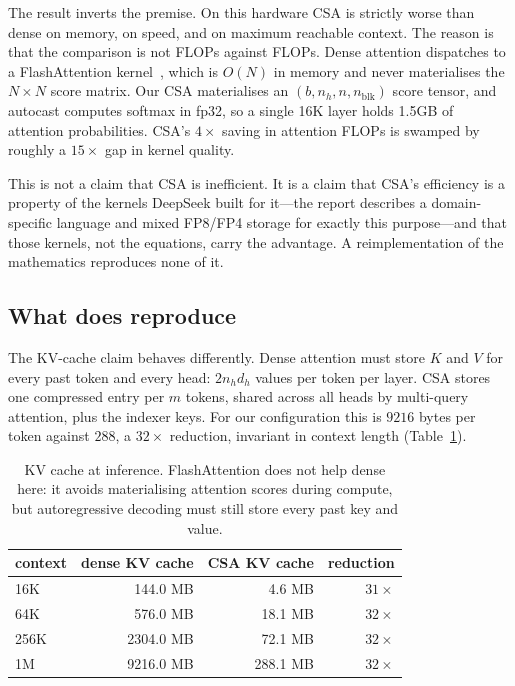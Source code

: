 \documentclass[11pt]{article}
\begin{document}
The result inverts the premise. On this hardware CSA is strictly worse than
dense on memory, on speed, and on maximum reachable context. The reason is that
the comparison is not FLOPs against FLOPs. Dense attention dispatches to a
FlashAttention kernel~\cite{dao2022flashattention}, which is $O(N)$ in memory
and never materialises the $N \times N$ score matrix. Our CSA materialises an
$(b, n_h, n, n_{\text{blk}})$ score tensor, and autocast computes softmax in
fp32, so a single 16K layer holds 1.5GB of attention probabilities. CSA's
$4\times$ saving in attention FLOPs is swamped by roughly a $15\times$ gap in
kernel quality.

This is not a claim that CSA is inefficient. It is a claim that CSA's
efficiency is a property of the kernels DeepSeek built for it---the report
describes a domain-specific language and mixed FP8/FP4 storage for exactly this
purpose---and that those kernels, not the equations, carry the advantage. A
reimplementation of the mathematics reproduces none of it.

\subsection{What does reproduce}

The KV-cache claim behaves differently. Dense attention must store $K$ and $V$
for every past token and every head: $2 n_h d_h$ values per token per layer.
CSA stores one compressed entry per $m$ tokens, shared across all heads by
multi-query attention, plus the indexer keys. For our configuration this is
$9216$ bytes per token against $288$, a $32\times$ reduction, invariant in
context length (Table~\ref{tab:kvcache}).

\begin{table}[h]
\centering
\small
\begin{tabular}{lrrr}
\toprule
context & dense KV cache & CSA KV cache & reduction \\
\midrule
16K  & 144.0 MB & 4.6 MB & $31\times$ \\
64K  & 576.0 MB & 18.1 MB & $32\times$ \\
256K & 2304.0 MB & 72.1 MB & $32\times$ \\
1M   & 9216.0 MB & 288.1 MB & $32\times$ \\
\bottomrule
\end{tabular}
\caption{KV cache at inference. FlashAttention does not help dense here: it
avoids materialising attention scores during compute, but autoregressive
decoding must still store every past key and value.}
\label{tab:kvcache}
\end{table}
\end{document}

